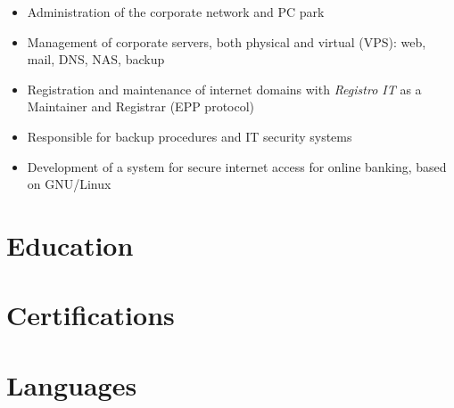 \vspace{3mm}
        {\begin{itemize}
          \item Administration of the corporate network and PC park
          \item Management of corporate servers, both physical and virtual (VPS): web, mail, DNS, NAS, backup
          \item Registration and maintenance of internet domains with \emph{Registro IT} as a Maintainer and Registrar (EPP protocol)
          \item Responsible for backup procedures and IT security systems
          \item Development of a system for secure internet access for online banking, based on GNU/Linux
        \end{itemize}}
\section{Education}
\pagebreak
\section{Certifications}
\section{Languages}
\vspace{3mm}
\closesection
